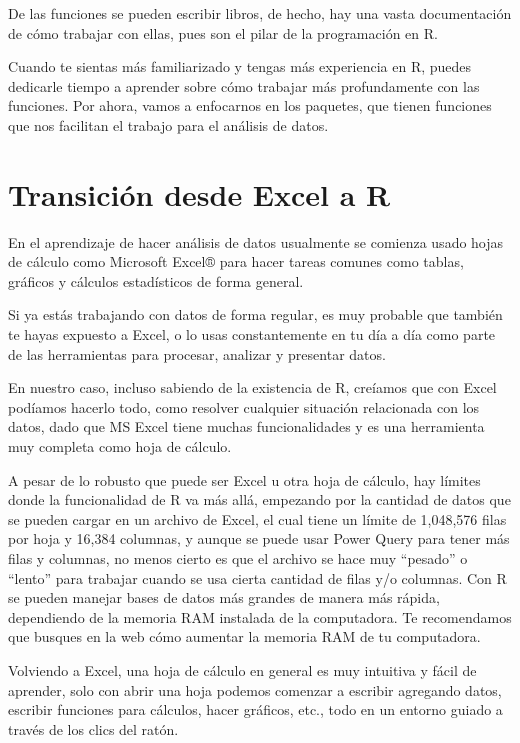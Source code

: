 \documentclass[
  letterpaper,
  DIV=11,
  numbers=noendperiod]{scrreprt}
\begin{document}
De las funciones se pueden escribir libros, de hecho, hay una vasta
documentación de cómo trabajar con ellas, pues son el pilar de la
programación en R.

Cuando te sientas más familiarizado y tengas más experiencia en R,
puedes dedicarle tiempo a aprender sobre cómo trabajar más profundamente
con las funciones. Por ahora, vamos a enfocarnos en los paquetes, que
tienen funciones que nos facilitan el trabajo para el análisis de datos.


\chapter{Transición desde Excel a
R}\label{transiciuxf3n-desde-excel-a-r}

En el aprendizaje de hacer análisis de datos usualmente se comienza
usado hojas de cálculo como Microsoft Excel® para hacer tareas comunes
como tablas, gráficos y cálculos estadísticos de forma general.

Si ya estás trabajando con datos de forma regular, es muy probable que
también te hayas expuesto a Excel, o lo usas constantemente en tu día a
día como parte de las herramientas para procesar, analizar y presentar
datos.

En nuestro caso, incluso sabiendo de la existencia de R, creíamos que
con Excel podíamos hacerlo todo, como resolver cualquier situación
relacionada con los datos, dado que MS Excel tiene muchas
funcionalidades y es una herramienta muy completa como hoja de cálculo.

A pesar de lo robusto que puede ser Excel u otra hoja de cálculo, hay
límites donde la funcionalidad de R va más allá, empezando por la
cantidad de datos que se pueden cargar en un archivo de Excel, el cual
tiene un límite de 1,048,576 filas por hoja y 16,384 columnas, y aunque
se puede usar Power Query para tener más filas y columnas, no menos
cierto es que el archivo se hace muy ``pesado'' o ``lento'' para
trabajar cuando se usa cierta cantidad de filas y/o columnas. Con R se
pueden manejar bases de datos más grandes de manera más rápida,
dependiendo de la memoria RAM instalada de la computadora. Te
recomendamos que busques en la web cómo aumentar la memoria RAM de tu
computadora.

Volviendo a Excel, una hoja de cálculo en general es muy intuitiva y
fácil de aprender, solo con abrir una hoja podemos comenzar a escribir
agregando datos, escribir funciones para cálculos, hacer gráficos, etc.,
todo en un entorno guiado a través de los clics del ratón.
\end{document}
